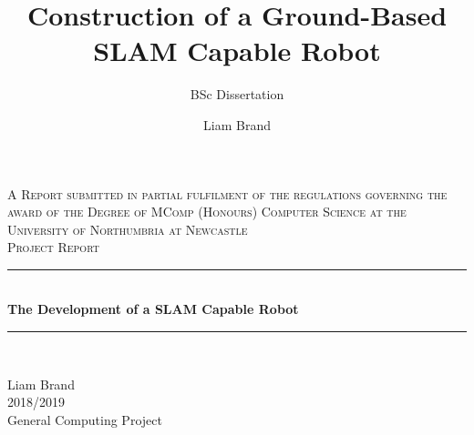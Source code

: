 \documentclass[a4paper,11pt,nocenter,bold,notitlepage,noheadline,noindent]{thesis}
\title{Construction of a Ground-Based SLAM Capable Robot}
\subtitle{BSc Dissertation}
\author{Liam Brand}
\date{}
\begin{document}
	\begin{titlepage}
		
		\newcommand{\HRule}{\rule{\linewidth}{0.5mm}} %
		
		\center %
		
		
		\textsc{\LARGE A Report submitted in partial fulfilment of
			the regulations governing the award of
			the Degree of
			MComp (Honours) Computer Science
			at the University of Northumbria at Newcastle}\\[1.5cm] %
		\textsc{\Large Project Report}\\[0.5cm] %
		
		
		\HRule \\[0.4cm]
		{ \huge \bfseries The Development of a SLAM Capable Robot}\\[0.4cm] %
		\HRule \\[1.5cm]
		
		\vfill
		\begin{minipage}{0.4\textwidth}
			\begin{flushleft} \large
				Liam Brand \\
				2018/2019 \\
				General Computing Project %
			\end{flushleft}
		\end{minipage}

		
	\end{titlepage}
	
	
	
	\tableofcontents
	\listoffigures
	\listoftables
	
	
	
	
	
	
	
	\nocite{stachniss2013robotmappingintro}
	
\end{document}
